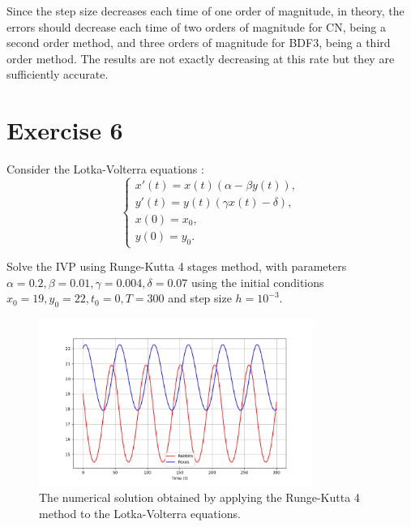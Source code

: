 \documentclass[a4paper,12pt]{article}
\begin{document}
Since the step size decreases each time of one order of magnitude, in theory, the errors
should decrease each time of two orders of magnitude for CN, being a second order method,
and three orders of magnitude for BDF3, being a third order method. 
The results are not exactly decreasing at this rate but they are sufficiently
accurate.

\section{Exercise 6}

Consider the Lotka-Volterra equations :
\begin{equation}
\begin{cases}
x'(t) = x(t)( \alpha - \beta y(t)) , \\
y'(t) = y(t)(\gamma x(t) - \delta) , \\
x(0) = x_0 , \\
y(0) = y_0 .
\end{cases}
\end{equation}

Solve the IVP using Runge-Kutta 4 stages method, with parameters $\alpha = 0.2 , \beta = 0.01 , \gamma = 0.004 , \delta = 0.07 $ using the initial conditions $x_0 = 19 , y_0 = 22 , t_0 = 0, T = 300$ and step size $h = 10^{-3}$.

\begin{figure}[H]
\centering
\includegraphics[width=0.8\textwidth]{lotka_volterra.png}
\caption{The numerical solution obtained by applying the Runge-Kutta 4 method to the Lotka-Volterra equations.}
\label{fig:lotka_volterra_solution}
\end{figure}
\end{document}
